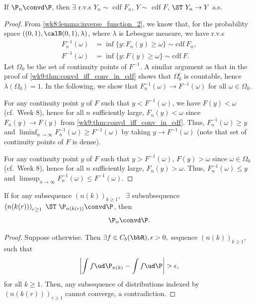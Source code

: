 \documentclass[../aipt.tex]{subfiles}
\begin{document}
\begin{Lemma}
If $\P_n \convd \P$, then $\exists$ r.v.s $Y_n \sim$ cdf $F_n$, $Y \sim$ cdf $F$, $\ST\ Y_n \to Y$ a.s.
\end{Lemma}
%
\begin{proof}
From \cref{wk8:lemma:inverse_function_2}, we know that, for the probability space $\left( (0, 1), \calB (0, 1), \lambda \right)$, where $\lambda$ is Lebesgue measure, we have r.v.s 
\begin{align*}
F_n^{-1}(\omega) &= \inf \big\{y: F_n(y) \geq \omega\big\} \sim \text{cdf}\ F_n, \\
F^{-1}(\omega) &= \inf \big\{y: F(y) \geq \omega\big\} \sim \text{cdf}\ F.
\end{align*}
Let $\Omega_0$ be the set of continuity points of $F^{-1}$. A similar argument as that in the proof of \cref{wk9:thm:convd_iff_conv_in_cdf} shows that $\Omega_0^c$ is countable, hence $\lambda(\Omega_0)=1$. In the following, we show that $F_n^{-1}(\omega) \to F^{-1}(\omega)$ for all $\omega\in\Omega_0$.

For any continuity point $y$ of $F$ such that $y < F^{-1}(\omega)$, we have $F(y) < \omega$ (cf.\ Week 8), hence for all $n$ sufficiently large, $F_n(y) < \omega$ since $F_n(y)\to F(y)$ from \cref{wk9:thm:convd_iff_conv_in_cdf}. Thus, $F_n^{-1}(\omega) \geq y$ and $\liminf_{n\to\infty}F_n^{-1}(\omega) \geq F^{-1}(\omega)$ by taking $y\to F^{-1}(\omega)$ (note that set of continuity points of $F$ is dense).
 
For any continuity point $y$ of $F$ such that $y > F^{-1}(\omega)$, $F(y) > \omega$ since $\omega\in\Omega_0$ (cf.\ Week 8), hence for all $n$ sufficiently large, $F_n(y) > \omega$. Thus, $F_n^{-1}(\omega) \leq y$ and $\limsup_{n\to\infty}F_n^{-1}(\omega) \leq F^{-1}(\omega)$.
\end{proof}
%
\begin{Lemma} \label{wk9:lemma:subseq_convd_implies_seq_convd}
If for any subsequence $\left(n(k)\right)_{k \geq 1}$, \ $\exists$ subsubsequence $\left(n(k(r))\right)_{r \geq 1}\ \ST\ \P_{n(k(r))} \convd \P$, then
\begin{align*}
\P_n \convd \P.
\end{align*}
\end{Lemma}
\begin{proof}
Suppose otherwise. Then $\exists f \in C_b(\bbR), \epsilon > 0,$ sequence $\left(n(k)\right)_{k \geq 1}$, such that
\begin{align*}
\left| \int f \ud \P_{n(k)} - \int f \ud \P \right| > \epsilon,
\end{align*}
for all $k\geq1$. Then, any subsequence of distributions indexed by $(n(k(r)))_{r\geq 1}$ cannot converge, a contradiction.
\end{proof}
\end{document}

